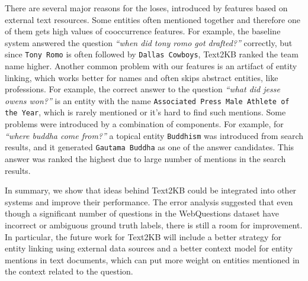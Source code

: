 There are several major reasons for the loses, introduced by features based on external text resources.
Some entities often mentioned together and therefore one of them gets high values of cooccurrence features.
For example, the baseline system answered the question \textit{``when did tony romo got drafted?''} correctly, but since \texttt{Tony Romo} is often followed by \texttt{Dallas Cowboys}, Text2KB ranked the team name higher.
Another common problem with our features is an artifact of entity linking, which works better for names and often skips abstract entities, like professions.
For example, the correct answer to the question \textit{``what did jesse owens won?''} is an entity with the name \texttt{Associated Press Male Athlete of the Year}, which is rarely mentioned or it's hard to find such mentions.
Some problems were introduced by a combination of components.
For example, for \textit{``where buddha come from?''} a topical entity \texttt{Buddhism} was introduced from search results, and it generated \texttt{Gautama Buddha} as one of the answer candidates.
This answer was ranked the highest due to large number of mentions in the search results.





In summary, we show that ideas behind Text2KB could be integrated into other systems and improve their performance.
The error analysis suggested that even though a significant number of questions in the WebQuestions dataset have incorrect or ambiguous ground truth labels, there is still a room for improvement.
In particular, the future work for Text2KB will include a better strategy for entity linking using external data sources and a better context model for entity mentions in text documents, which can put more weight on entities mentioned in the context related to the question.
